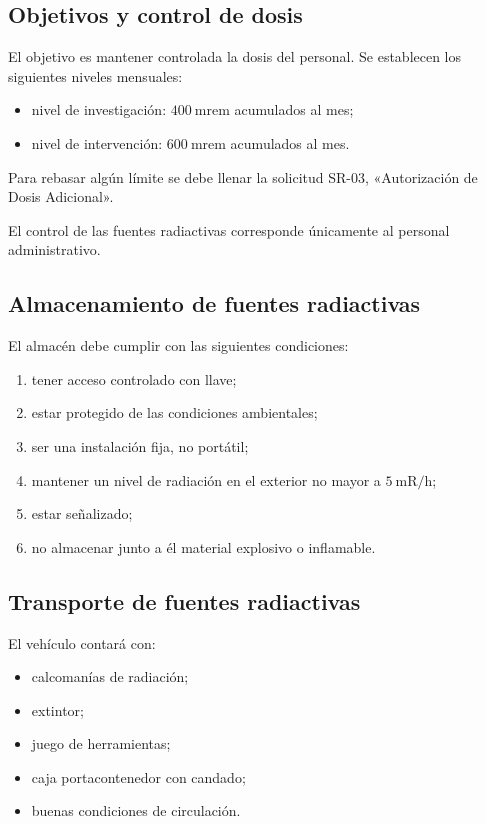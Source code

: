 \subsection{Objetivos y control de dosis}

El objetivo es mantener controlada la dosis del personal. Se establecen los siguientes niveles mensuales:
\begin{itemize}
  \item nivel de investigación: $400\ \mathrm{mrem}$ acumulados al mes;
  \item nivel de intervención: $600\ \mathrm{mrem}$ acumulados al mes.
\end{itemize}

Para rebasar algún límite se debe llenar la solicitud SR-03, «Autorización de Dosis Adicional».

El control de las fuentes radiactivas corresponde únicamente al personal administrativo.

\subsection{Almacenamiento de fuentes radiactivas}

El almacén debe cumplir con las siguientes condiciones:
\begin{enumerate}[label=\alph*)]
  \item tener acceso controlado con llave;
  \item estar protegido de las condiciones ambientales;
  \item ser una instalación fija, no portátil;
  \item mantener un nivel de radiación en el exterior no mayor a $5\ \mathrm{mR/h}$;
  \item estar señalizado;
  \item no almacenar junto a él material explosivo o inflamable.
\end{enumerate}

\subsection{Transporte de fuentes radiactivas}

El vehículo contará con:
\begin{itemize}
  \item calcomanías de radiación;
  \item extintor;
  \item juego de herramientas;
  \item caja portacontenedor con candado;
  \item buenas condiciones de circulación.
\end{itemize}

